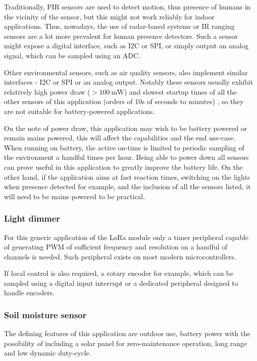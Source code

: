 Traditionally, PIR sensors are used to detect motion, thus presence of humans in the vicinity of the sensor, but this might not work reliably for indoor applications. Thus, nowadays, the use of radar-based systems \cite{infineon_technologies_presence_2024} or IR ranging sensors \cite{stmicroelectronics_human_2024} are a lot more prevalent for human presence detectors. Such a sensor might expose a digital interface, such as I2C or SPI, or simply output an analog signal, which can be sampled using an ADC.

Other environmental sensors, such as air quality sensors, also implement similar interfaces - I2C or SPI or an analog output. Notably these sensors usually exhibit relatively high power draw ($>100~\mathrm{mW}$) and slowest startup times of all the other sensors of this application (orders of 10s of seconds to minutes) \cite{amphenol_inc_mics-vz-89te_2024}, so they are not suitable for battery-powered applications.

On the note of power draw, this application may wish to be battery powered or remain mains powered, this will affect the capabilities and the end use-case. When running on battery, the active on-time is limited to periodic sampling of the environment a handful times per hour. Being able to power down all sensors can prove useful in this application to greatly improve the battery life. On the other hand, if the application aims at fast reaction times, switching on the lights when presence detected for example, and the inclusion of all the sensors listed, it will need to be mains powered to be practical.

\subsubsection{Light dimmer}
For this generic application of the LoRa module only a timer peripheral capable of generating PWM of sufficient frequency and resolution on a handful of channels is needed. Such peripheral exists on most modern microcontrollers.

If local control is also required, a rotary encoder for example, which can be sampled using a digital input interrupt or a dedicated peripheral designed to handle encoders.

\subsubsection{Soil moisture sensor}
The defining features of this application are outdoor use, battery power with the possibility of including a solar panel for zero-maintenance operation, long range and low dynamic duty-cycle.

